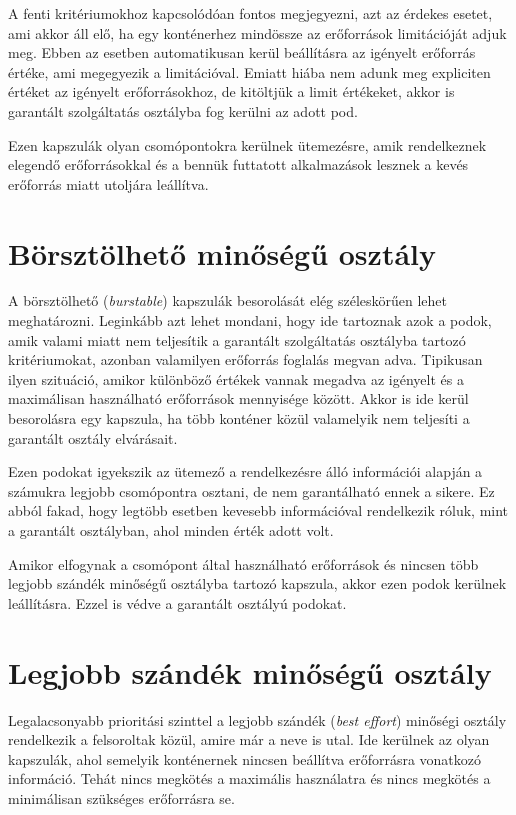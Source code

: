 A fenti kritériumokhoz kapcsolódóan fontos megjegyezni, azt az érdekes esetet, ami akkor áll elő, ha egy konténerhez mindössze az erőforrások limitációját adjuk meg.
Ebben az esetben automatikusan kerül beállításra az igényelt erőforrás értéke, ami megegyezik a limitációval.
Emiatt hiába nem adunk meg expliciten értéket az igényelt erőforrásokhoz, de kitöltjük a limit értékeket, akkor is garantált szolgáltatás osztályba fog kerülni az adott pod.

Ezen kapszulák olyan csomópontokra kerülnek ütemezésre, amik rendelkeznek elegendő erőforrásokkal és a bennük futtatott alkalmazások lesznek a kevés erőforrás miatt utoljára leállítva.

\section{Börsztölhető minőségű osztály}
A börsztölhető (\textit{burstable}) kapszulák besorolását elég széleskörűen lehet meghatározni.
Leginkább azt lehet mondani, hogy ide tartoznak azok a podok, amik valami miatt nem teljesítik a garantált szolgáltatás osztályba tartozó kritériumokat, azonban valamilyen erőforrás foglalás megvan adva.
Tipikusan ilyen szituáció, amikor különböző értékek vannak megadva az igényelt és a maximálisan használható erőforrások mennyisége között.
Akkor is ide kerül besorolásra egy kapszula, ha több konténer közül valamelyik nem teljesíti a garantált osztály elvárásait.

Ezen podokat igyekszik az ütemező a rendelkezésre álló információi alapján a számukra legjobb csomópontra osztani, de nem garantálható ennek a sikere.
Ez abból fakad, hogy legtöbb esetben kevesebb információval rendelkezik róluk, mint a garantált osztályban, ahol minden érték adott volt.

Amikor elfogynak a csomópont által használható erőforrások és nincsen több legjobb szándék minőségű osztályba tartozó kapszula, akkor ezen podok kerülnek leállításra. 
Ezzel is védve a garantált osztályú podokat.

\section{Legjobb szándék minőségű osztály}
Legalacsonyabb prioritási szinttel a legjobb szándék (\textit{best effort}) minőségi osztály rendelkezik a felsoroltak közül, amire már a neve is utal.
Ide kerülnek az olyan kapszulák, ahol semelyik konténernek nincsen beállítva erőforrásra vonatkozó információ.
Tehát nincs megkötés a maximális használatra és nincs megkötés a minimálisan szükséges erőforrásra se.

